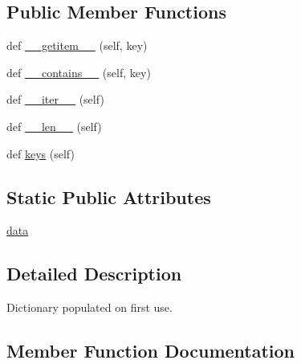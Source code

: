 \subsection*{Public Member Functions}
\begin{DoxyCompactItemize}
\item 
def \hyperlink{classpytz_1_1lazy_1_1LazyDict_a4cfdbb3d5ca861fd05fc3c90a477f5dd}{\+\_\+\+\_\+getitem\+\_\+\+\_\+} (self, key)
\item 
def \hyperlink{classpytz_1_1lazy_1_1LazyDict_af8911a3673c76c38bedb667f0911ca90}{\+\_\+\+\_\+contains\+\_\+\+\_\+} (self, key)
\item 
def \hyperlink{classpytz_1_1lazy_1_1LazyDict_ac9626d251a6632f987b469ff40694362}{\+\_\+\+\_\+iter\+\_\+\+\_\+} (self)
\item 
def \hyperlink{classpytz_1_1lazy_1_1LazyDict_abb558b8c37f6856e858cde37fc2e1c20}{\+\_\+\+\_\+len\+\_\+\+\_\+} (self)
\item 
def \hyperlink{classpytz_1_1lazy_1_1LazyDict_a8603bc5b0fb670fddcf30b2e1cfcd000}{keys} (self)
\end{DoxyCompactItemize}
\subsection*{Static Public Attributes}
\begin{DoxyCompactItemize}
\item 
\hyperlink{classpytz_1_1lazy_1_1LazyDict_ac1a1bcdec25eab43aa8603ddeb28e2ca}{data}
\end{DoxyCompactItemize}


\subsection{Detailed Description}
\begin{DoxyVerb}Dictionary populated on first use.\end{DoxyVerb}
 

\subsection{Member Function Documentation}
\mbox{\label{classpytz_1_1lazy_1_1LazyDict_af8911a3673c76c38bedb667f0911ca90}} 
